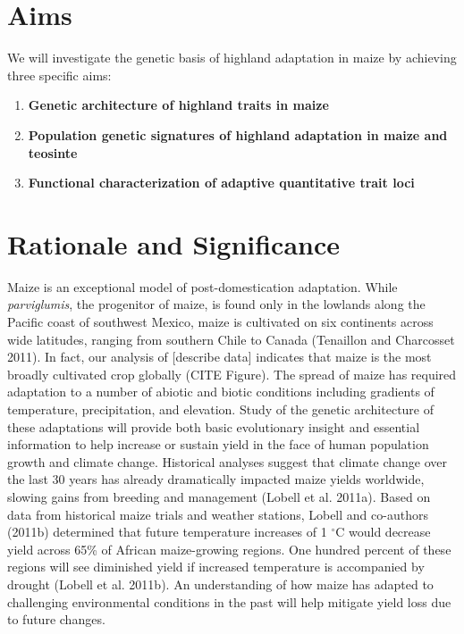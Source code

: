
\section*{Aims}

We will investigate the genetic basis of highland adaptation in maize by achieving three specific aims:

\begin{enumerate}
\item {\bf Genetic architecture of highland traits in maize}
\item {\bf Population genetic signatures of highland adaptation in maize and teosinte}
\item {\bf Functional characterization of adaptive quantitative trait loci}
\end{enumerate}

\section*{Rationale and Significance}
Maize is an exceptional model of post-domestication adaptation.  While \emph{parviglumis}, the progenitor of maize, is found only in the lowlands along the Pacific coast of southwest Mexico, maize is cultivated on six continents across wide latitudes, ranging from southern Chile to Canada (Tenaillon and Charcosset 2011).  In fact, our analysis of [describe data] indicates that maize is the most broadly cultivated crop globally (CITE Figure).  The spread of maize has required adaptation to a number of abiotic and biotic conditions including gradients of temperature, precipitation, and elevation.  Study of the genetic architecture of these adaptations will provide both basic evolutionary insight and essential information to help increase or sustain yield in the face of human population growth and climate change. Historical analyses suggest that climate change over the last 30 years has already dramatically impacted maize yields worldwide, slowing gains from breeding and management (Lobell et al. 2011a).  Based on data from historical maize trials and weather stations, Lobell and co-authors (2011b) determined that future temperature increases of 1 $^{\circ}$C would decrease yield across 65\% of African maize-growing regions.  One hundred percent of these regions will see diminished yield if increased temperature is accompanied by drought (Lobell et al. 2011b).  An understanding of how maize has adapted to challenging environmental conditions in the past will help mitigate yield loss due to future changes.


